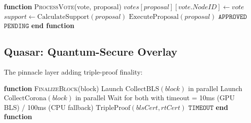 \begin{algorithmic}[1]
\State \textbf{function} \textsc{ProcessVote}(vote, proposal)
    \State $votes[proposal][vote.NodeID] \gets vote$
    \State $support \gets \text{CalculateSupport}(proposal)$
        \State $\text{ExecuteProposal}(proposal)$
        \State \Return $\texttt{APPROVED}$
    \EndIf
    \State \Return $\texttt{PENDING}$
\State \textbf{end function}
\end{algorithmic}


\subsection{Quasar: Quantum-Secure Overlay}

The pinnacle layer adding triple-proof finality:



\begin{algorithmic}[1]
\State \textbf{function} \textsc{FinalizeBlock}(block)
    \State Launch $\text{CollectBLS}(block)$ in parallel
    \State Launch $\text{CollectCorona}(block)$ in parallel
    \State Wait for both with timeout = 10ms (GPU BLS) / 100ms (CPU fallback)
        \State \Return $\text{TripleProof}(blsCert, rtCert)$
    \Else
        \State \Return $\texttt{TIMEOUT}$ 
    \EndIf
\State \textbf{end function}
\end{algorithmic}


